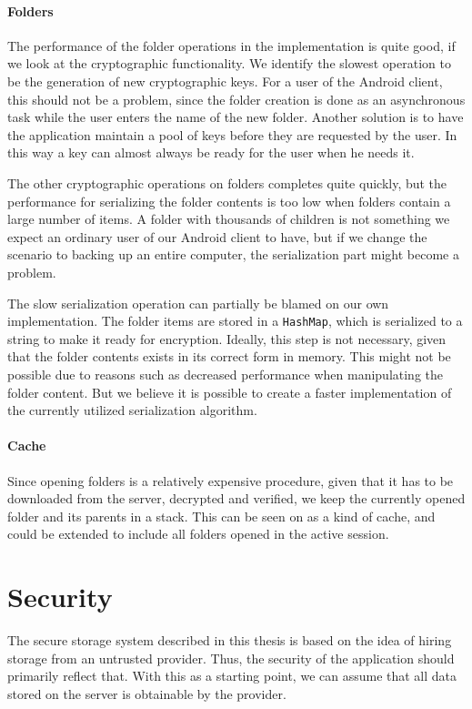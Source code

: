 \documentclass[pdftex,english,10pt,b5paper,twoside]{book}
\begin{document}
\paragraph{Folders} The performance of the folder operations in the
implementation is quite good, if we look at the cryptographic
functionality. We identify the slowest operation to be the generation of
new cryptographic keys. For a user of the Android client, this should not be a
problem, since the folder creation is done as an asynchronous task while the
user enters the name of the new folder. Another solution is to have the
application maintain a pool of keys before they are requested by the user. In
this way a key can almost always be ready for the user when he needs it.

The other cryptographic operations on folders completes quite quickly, but the
performance for serializing the folder contents is too low when folders contain
a large number of items. A folder with thousands of children is not
something we expect an ordinary user of our Android client to have, but if we
change the scenario to backing up an entire computer, the serialization part
might become a problem. 

The slow serialization operation can partially be blamed on our own
implementation. The folder items are stored in a \texttt{HashMap}, which is
serialized to a string to make it ready for encryption. Ideally, this step is
not necessary, given that the folder contents exists in its correct form in
memory. This might not be possible due to reasons such as decreased performance
when manipulating the folder content. But we believe it is possible to create a
faster implementation of the currently utilized serialization algorithm.

\paragraph{Cache} Since opening folders is a relatively expensive procedure,
given that it has to be downloaded from the server, decrypted and verified, we
keep the currently opened folder and its parents in a stack. This can be seen
on as a kind of cache, and could be extended to include all folders opened
in the active session.

\section{Security}

The secure storage system described in this thesis is based on the idea of
hiring storage from an untrusted provider. Thus, the security of the
application should primarily reflect that. With this as a starting point, we
can assume that all data stored on the server is obtainable by the provider.
\end{document}
